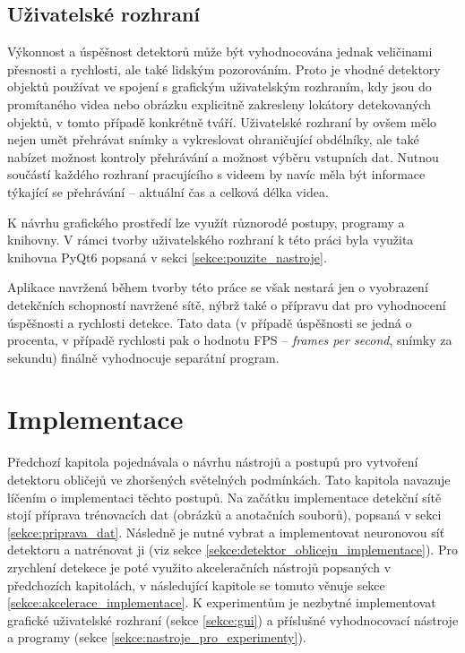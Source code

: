 \section{Uživatelské rozhraní}
Výkonnost a úspěšnost detektorů může být vyhodnocována jednak veličinami přesnosti a rychlosti, ale také lidským pozorováním. Proto je vhodné detektory objektů používat ve spojení s grafickým uživatelským rozhraním, kdy jsou do promítaného videa nebo obrázku explicitně zakresleny lokátory detekovaných objektů, v tomto případě konkrétně tváří. Uživatelské rozhraní by ovšem mělo nejen umět přehrávat snímky a vykreslovat ohraničující obdélníky, ale také nabízet možnost kontroly přehrávání a možnost výběru vstupních dat. Nutnou součástí každého rozhraní pracujícího s videem by navíc měla být informace týkající se přehrávání -- aktuální čas a celková délka videa.

K návrhu grafického prostředí lze využít různorodé postupy, programy a knihovny. V rámci tvorby uživatelského rozhraní k této práci byla využita knihovna PyQt6 popsaná v sekci \ref{sekce:pouzite_nastroje}.

Aplikace navržená během tvorby této práce se však nestará jen o vyobrazení detekčních schopností navržené sítě, nýbrž také o přípravu dat pro vyhodnocení úspěšnosti a rychlosti detekce. Tato data (v případě úspěšnosti se jedná o procenta, v případě rychlosti pak o hodnotu FPS -- \emph{frames per second}, snímky za sekundu) finálně vyhodnocuje separátní program.

\chapter{Implementace}
\label{kapitola:implementace}
Předchozí kapitola pojednávala o návrhu nástrojů a postupů pro vytvoření detektoru obličejů ve zhoršených světelných podmínkách. Tato kapitola navazuje líčením o implementaci těchto postupů. Na začátku implementace detekční sítě stojí příprava trénovacích dat (obrázků a anotačních souborů), popsaná v sekci \ref{sekce:priprava_dat}. Následně je nutné vybrat a implementovat neuronovou síť detektoru a natrénovat ji (viz sekce \ref{sekce:detektor_obliceju_implementace}). Pro zrychlení detekece je poté využito akceleračních nástrojů popsaných v předchozích kapitolách, v následující kapitole se tomuto věnuje sekce \ref{sekce:akcelerace_implementace}. K experimentům je nezbytné implementovat grafické uživatelské rozhraní (sekce \ref{sekce:gui}) a příslušné vyhodnocovací nástroje a programy (sekce \ref{sekce:nastroje_pro_experimenty}).

